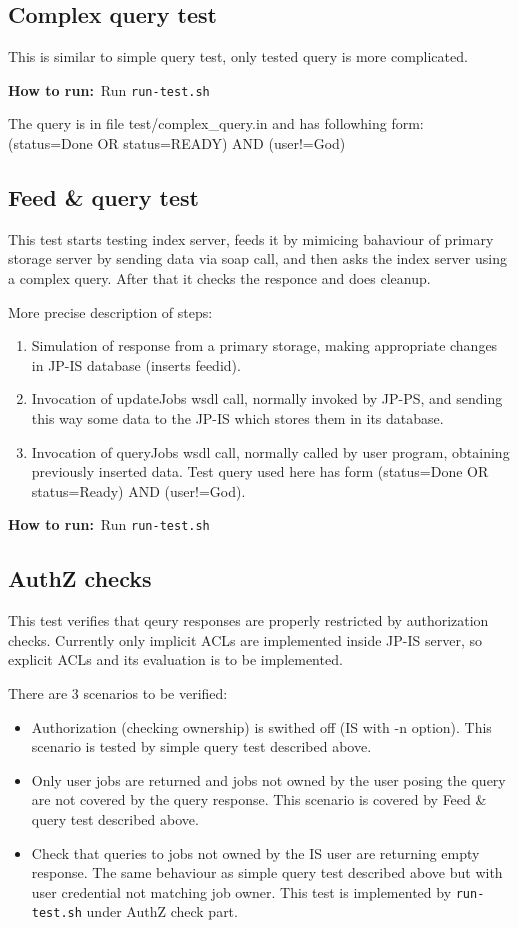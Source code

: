 \documentclass{egee}
\def\how{\noindent\textbf{How to run:}}
\begin{document}
\subsection{Complex query test}
This is similar to simple query test, only tested query is more complicated.

\how\ Run \texttt{run-test.sh}

\begin{hints}
The query is in file test/complex\_query.in and has followhing
  form: (status=Done OR status=READY) AND (user!=God)
\end{hints}

\subsection{Feed \& query test}
This test starts testing index server, feeds it by
mimicing bahaviour of primary storage server by sending data
via soap call, and then asks the index server using a complex
query. After that it checks the responce and does cleanup.

More precise description of steps:
\begin{enumerate}
 \item Simulation of response from a primary storage, making appropriate
   changes in JP-IS database (inserts feedid).
 \item Invocation of updateJobs wsdl call, normally invoked by JP-PS, and
   sending this way some data to the JP-IS which stores them in its database.
 \item Invocation of queryJobs wsdl call, normally called by user
   program, obtaining previously inserted data. Test query used here has form
   (status=Done OR status=Ready) AND (user!=God).
\end{enumerate}

\how\ Run \texttt{run-test.sh}

\subsection{AuthZ checks}
This test verifies that qeury responses are properly restricted by
authorization checks. Currently only implicit ACLs are implemented
inside JP-IS server, so explicit ACLs and its evaluation is to be implemented.

There are 3 scenarios to be verified:
\begin{itemize}
 \item Authorization (checking ownership) is swithed off (IS with -n
   option). This scenario is tested by simple query test described above.
 \item Only user jobs are returned and jobs not owned by the user posing
   the query are not covered by the query response. This scenario is
   covered by Feed \& query test described above.
 \item Check that queries to jobs not owned by the IS user are
   returning empty response. The same behaviour as simple query test
   described above but with user credential not matching job
   owner. This test is implemented by \texttt{run-test.sh} under AuthZ
   check part.
\end{itemize}
\end{document}
